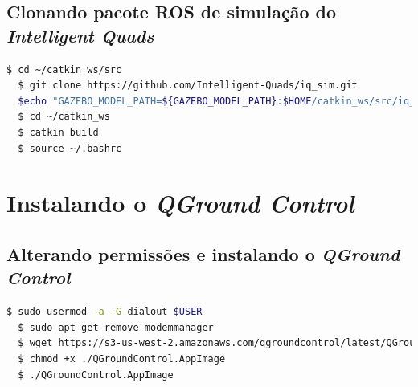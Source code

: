\documentclass[12pt,a4paper,oneside]{book}
\begin{document}
\subsection{Clonando pacote ROS de simulação do \textit{Intelligent Quads}}
\begin{lstlisting}[language=bash] 
  $ cd ~/catkin_ws/src
  $ git clone https://github.com/Intelligent-Quads/iq_sim.git
  $echo "GAZEBO_MODEL_PATH=${GAZEBO_MODEL_PATH}:$HOME/catkin_ws/src/iq_sim/models" >> ~/.bashrc
  $ cd ~/catkin_ws
  $ catkin build
  $ source ~/.bashrc
\end{lstlisting}

\section{Instalando o \textit{QGround Control}}

\subsection{Alterando permissões e instalando o \textit{QGround Control}}
\begin{lstlisting}[language=bash] 
  $ sudo usermod -a -G dialout $USER
  $ sudo apt-get remove modemmanager
  $ wget https://s3-us-west-2.amazonaws.com/qgroundcontrol/latest/QGroundControl.AppImage
  $ chmod +x ./QGroundControl.AppImage 
  $ ./QGroundControl.AppImage
\end{lstlisting}
%
%
\end{document}
